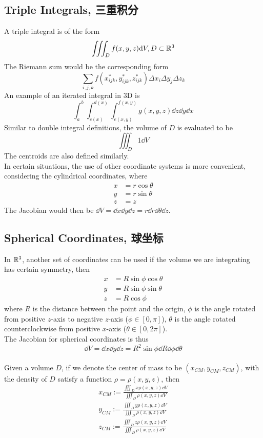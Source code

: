 \subsection{Triple Integrals, 三重积分}
A triple integral is of the form
$$\iiint_D f(x, y, z) \dd V, D \subset \mathbb{R}^3$$
The Riemann sum would be the corresponding form
$$\sum_{i, j, k}f(x_{ijk}^{*}, y_{ijk}^{*}, z_{ijk}^{*})\Delta x_i \Delta y_j \Delta z_k$$
An example of an iterated integral in 3D is
$$\int_a^b \int_{c(x)}^{d(x)} \int_{e(x, y)}^{f(x, y)} g(x, y, z) \dd z \dd y \dd x$$
Similar to double integral definitions, the volume of $D$ is evaluated to be
$$\iiint_D 1 \dd V$$
The centroids are also defined similarly. \\
In certain situations, the use of other coordinate systems is more convenient, considering the cylindrical coordinates, where
\begin{align*}
    x &= r \cos{\theta} \\
    y &= r \sin{\theta} \\
    z &= z
\end{align*}
The Jacobian would then be $\dd V = \dd x \dd y \dd z = r \dd r \dd \theta \dd z$.

\subsection{Spherical Coordinates, 球坐标}
In $\mathbb{R}^3$, another set of coordinates can be used if the volume we are integrating has certain symmetry, then
\begin{align*}
    x &= R\sin{\phi}\cos{\theta} \\
    y &= R\sin{\phi}\sin{\theta} \\
    z &= R\cos{\phi}
\end{align*}
where $R$ is the distance between the point and the origin, $\phi$ is the angle rotated from positive $z$-axis to negative $z$-axis ($\phi \in [0, \pi]$), $\theta$ is the angle rotated counterclockwise from positive $x$-axis ($\theta \in [0, 2\pi]$). \\
The Jacobian for spherical coordinates is thus
$$\dd V = \dd x \dd y \dd z = R^2\sin{\phi} \dd R \dd \phi \dd \theta$$
\\
Given a volume $D$, if we denote the center of mass to be $(x_{CM}, y_{CM}, z_{CM})$, with the density of $D$ satisfy a function $\rho  = \rho(x, y, z)$, then
\begin{align*}
    x_{CM} := \frac{\iiint_D x \rho(x, y, z) \dd V}{\iiint_D \rho(x, y, z) \dd V} \\
    y_{CM} := \frac{\iiint_D y \rho(x, y, z) \dd V}{\iiint_D \rho(x, y, z) \dd V} \\
    z_{CM} := \frac{\iiint_D z \rho(x, y, z) \dd V}{\iiint_D \rho(x, y, z) \dd V} \\
\end{align*}